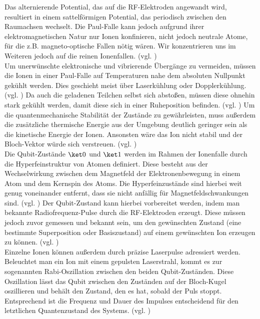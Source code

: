 Das alternierende Potential, das auf die RF-Elektroden angewandt wird, resultiert in einem sattelförmigen Potential, das periodisch zwischen den Raumachsen wechselt. Die Paul-Falle kann jedoch aufgrund ihrer elektromagnetischen Natur nur Ionen konfinieren, nicht jedoch neutrale Atome, für die z.B. magneto-optische Fallen nötig wären. Wir konzentrieren uns im Weiteren jedoch auf die reinen Ionenfallen. (vgl. \cite[Ch. 21.1]{lapierre_getting_2022}) %
\\

Um unerwünschte elektronische und vibrierende Übergänge zu vermeiden, müssen die Ionen in einer Paul-Falle auf Temperaturen nahe dem absoluten Nullpunkt gekühlt werden. Dies geschieht meist über Laserkühlung oder Dopplerkühlung. (vgl. \cite[Ch. 21.1]{lapierre_introduction_2021}) %
Da auch die geladenen Teilchen selbst sich abstoßen, müssen diese ohnehin stark gekühlt werden, damit diese sich in einer Ruheposition befinden. (vgl. \cite[Ch 10.4]{homeister_quantum_2022})
Um die quantenmechanische Stabilität der Zustände zu gewährleisten, muss außerdem die zusätzliche thermische Energie aus der Umgebung deutlich geringer sein als die kinetische Energie der Ionen. Ansonsten wäre das Ion nicht stabil und der Bloch-Vektor würde sich verstreuen. (vgl. \cite[Ch. 4.6.1]{kasirajan_fundamentals_2021}) %
\\

Die Qubit-Zustände $\ket0$ und $\ket1$ werden im Rahmen der Ionenfalle durch die Hyperfeinstruktur von Atomen definiert. Diese besteht aus der Wechselwirkung zwischen dem Magnetfeld der Elektronenbewegung in einem Atom und dem Kernspin des Atoms. Die Hyperfeinzustände sind hierbei weit genug voneinander entfernt, dass sie nicht anfällig für Magnetfeldschwankungen sind. (vgl. \cite[Ch. 4.6.1]{kasirajan_fundamentals_2021}) %
Der Qubit-Zustand kann hierbei vorbereitet werden, indem man bekannte Radiofrequenz-Pulse durch die RF-Elektroden erzeugt. Diese müssen jedoch zuvor gemessen und bekannt sein, um den gewünschten Zustand (eine bestimmte Superposition oder Basiszustand) auf einem gewünschten Ion erzeugen zu können. (vgl. \cite[Ch.4.6.1]{kasirajan_fundamentals_2021}) %
\\

Einzelne Ionen können außerdem durch präzise Laserpulse adressiert werden. Beleuchtet man ein Ion mit einem gepulsten Laserstrahl, kommt es zur sogenannten Rabi-Oszillation zwischen den beiden Qubit-Zuständen. Diese Oszillation lässt das Qubit zwischen den Zuständen auf der Bloch-Kugel oszillieren und behält den Zustand, den es hat, sobald der Puls stoppt. Entsprechend ist die Frequenz und Dauer des Impulses entscheidend für den letztlichen Quantenzustand des Systems. (vgl. \cite[Ch 21.1]{lapierre_introduction_2021}) %
\\

